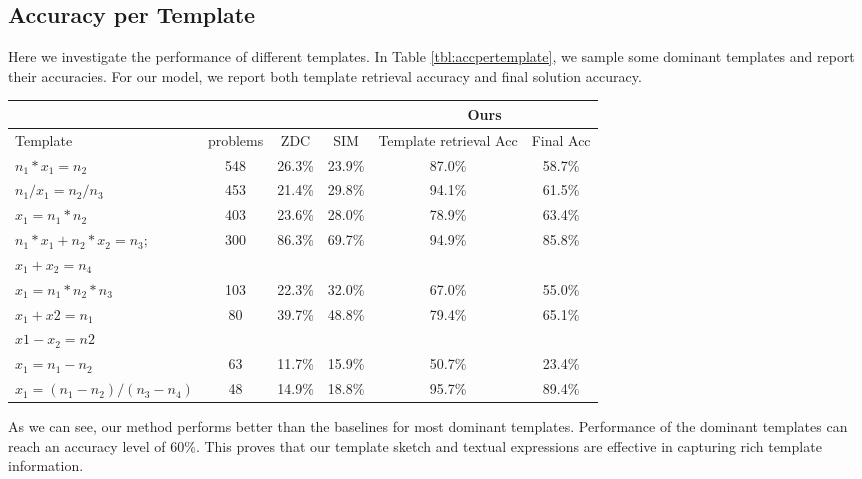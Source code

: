 \documentclass[11pt,letterpaper]{article}
\begin{document}
\subsection{Accuracy per Template}
Here we investigate the performance of different templates. In Table \ref{tbl:accpertemplate}, we sample some dominant templates and report their accuracies. For our model, we report both template retrieval accuracy and final solution accuracy.

\begin{table*}[htb]
\begin{center}
	\begin{tabular}{l|c|c|c|c|c}
        \hline
		 &  &  &  & \multicolumn{2}{c}{Ours} \\
        \hline
        Template  &   problems &   ZDC  &  SIM   & Template retrieval Acc & Final Acc\\
        \hline
		$n_{1}*x_{1}=n_{2}$ & 548 & 26.3\% & 23.9\% & 87.0\% & 58.7\%\\
        \hline
		$n_{1}/x_{1}=n_{2}/n_{3}$ & 453 & 21.4\% & 29.8\% & 94.1\% & 61.5\%\\
        \hline
		$x_{1}=n_{1}*n_{2}$ & 403 & 23.6\% & 28.0\% & 78.9\% & 63.4\%\\
        \hline
		$n_{1}*x_{1}+n_{2}*x_{2}=n_{3};$ & 300 & 86.3\% & 69.7\% & 94.9\% & 85.8\%\\
        $x_{1}+x_{2}=n_{4}$     &     &        &        &        &\\
        \hline
        $x_{1}=n_{1}*n_{2}*n_{3}$ & 103 & 22.3\% & 32.0\% & 67.0\% & 55.0\%\\
		\hline
		$x_{1}+x{2}=n_{1}$ & 80 & 39.7\% & 48.8\% & 79.4\% & 65.1\%\\
        $x{1}-x_{2}=n{2}$  &   &        &         &    &   \\
		\hline
        $x_{1}=n_{1}-n_{2}$ & 63 & 11.7\% & 15.9\% & 50.7\% & 23.4\%\\
		\hline
        $x_{1}=(n_{1}-n_{2})/(n_{3}-n_{4})$ & 48 & 14.9\% & 18.8\% & 95.7\% & 89.4\%\\
		\hline
	\end{tabular}
\end{center}
	\caption{Accuracy Per Template. Template retrieval acc reports percent of templates appears in one of the top 3 templates returned by our method.}\label{tbl:accpertemplate}
\end{table*}

As we can see, our method performs better than the baselines for most dominant templates. Performance of the dominant templates can reach an accuracy level of 60\%. This proves that our template sketch and textual expressions are effective in capturing rich template information.
\end{document}
